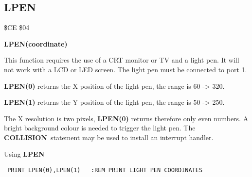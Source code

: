 \subsection{LPEN}
\begin{description}[leftmargin=2cm,style=nextline]
\item [Token:] \$CE \$04
\item [Format:] {\bf LPEN(coordinate)}
\item [Usage:] This function requires the use of a
               CRT monitor or TV and a light pen.
               It will not work with a LCD or LED screen.
               The light pen must be connected to port 1.

               {\bf LPEN(0)} returns the X position of the light pen,
               the range is 60 -> 320.

               {\bf LPEN(1)} returns the Y position of the light pen,
               the range is 50 -> 250.

\item [Remarks:] The X resolution is two pixels, {\bf LPEN(0)} returns
                 therefore only even numbers.
                 A bright background colour is needed to trigger
                 the light pen. The {\bf COLLISION} statement may
                 be used to install an interrupt handler.

\item [Example:] Using {\bf LPEN}
\begin{tcolorbox}[colback=black,coltext=white]
\verbatimfont{\codefont}
\begin{verbatim}
 PRINT LPEN(0),LPEN(1)   :REM PRINT LIGHT PEN COORDINATES
\end{verbatim}
\end{tcolorbox}
\end{description}


\newpage
